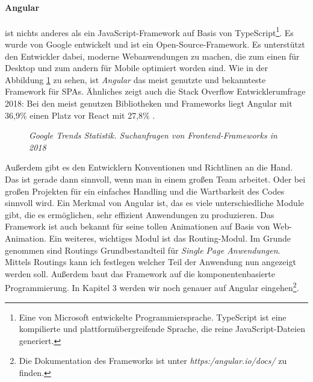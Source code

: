 \paragraph{Angular}
\label{p:angular}
%
ist nichts anderes als ein JavaScript-Framework auf Basis von TypeScript\footnote{Eine von Microsoft entwickelte Programmiersprache. TypeScript ist eine kompilierte und plattformübergreifende Sprache, die reine JavaScript-Dateien generiert.}. Es wurde von Google entwickelt und ist ein Open-Source-Framework. Es unterstützt den Entwickler dabei, moderne Webanwendungen zu machen, die zum einen für Desktop und zum andern für Mobile optimiert worden sind. Wie in der Abbildung \ref{fig:googletrends} zu sehen, ist \textit{Angular} das meist genutzte und bekannteste Framework für SPAs. Ähnliches zeigt auch die Stack Overflow Entwicklerumfrage 2018: Bei den meist genutzen Bibliotheken und Frameworks liegt Angular mit 36,9\% einen Platz vor React mit 27,8\% \cite{stackoverflow_stack_2018}.
%
\begin{figure}[h]
	\centering
	{}
	\caption[Audi Konfigurator]{\textit{Google Trends Statistik. Suchanfragen von Frontend-Frameworks in 2018}}
	\label{fig:googletrends}
\end{figure}
%
Außerdem gibt es den Entwicklern Konventionen und Richtlinen an die Hand. Das ist gerade dann sinnvoll, wenn man in einem großen Team arbeitet. Oder bei großen Projekten für ein einfaches Handling und die Wartbarkeit des Codes sinnvoll wird. Ein Merkmal von Angular ist, das es viele unterschiedliche Module gibt, die es ermöglichen, sehr effizient Anwendungen zu produzieren. Das Framework ist auch bekannt für seine tollen Animationen auf Basis von Web-Animation. Ein weiteres, wichtiges Modul ist das Routing-Modul. Im Grunde genommen sind Routings Grundbestandteil für \textit{Single Page Anwendungen}. Mittels Routings kann ich festlegen welcher Teil der Anwendung nun angezeigt werden soll. Außerdem baut das Framework auf die komponentenbasierte Programmierung. In Kapitel 3 werden wir noch genauer auf Angular eingehen\footnote{Die Dokumentation des Frameworks ist unter \textit{https:/angular.io/docs/} zu finden.}.
%

%

